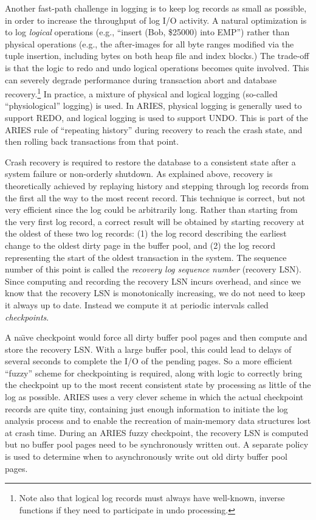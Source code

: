 \documentclass[a4paper,11pt,twoside,openright]{book}
\begin{document}
Another fast-path challenge in logging is to keep log records as small
as possible, in order to increase the throughput of log I/O activity. A
natural optimization is to log \emph{logical} operations (e.g., ``insert
(Bob, \$25000) into EMP'') rather than physical operations (e.g., the
after-images for all byte ranges modified via the tuple insertion,
including bytes on both heap file and index blocks.) The trade-off is
that the logic to redo and undo logical operations becomes quite
involved. This can severely degrade performance during transaction abort
and database recovery.\footnote{Note also that logical log records must always have well-known,
inverse functions if they need to participate in undo processing.} In practice, a mixture of
physical and logical logging (so-called ``physiological'' logging) is
used. In ARIES, physical logging is generally used to support REDO, and
logical logging is used to support UNDO. This is part of the ARIES rule
of ``repeating history'' during recovery to reach the crash state, and
then rolling back transactions from that point.

Crash recovery is required to restore the database to a consistent state
after a system failure or non-orderly shutdown. As explained above,
recovery is theoretically achieved by replaying history and stepping
through log records from the first all the way to the most recent
record. This technique is correct, but not very efficient since the log
could be arbitrarily long. Rather than starting from the very first log
record, a correct result will be obtained by starting recovery at the
oldest of these two log records: (1) the log record describing the
earliest change to the oldest dirty page in the buffer pool, and (2) the
log record representing the start of the oldest transaction in the
system. The sequence number of this point is called the \emph{recovery
log sequence} \emph{number} (recovery LSN). Since computing and
recording the recovery LSN incurs overhead, and since we know that the
recovery LSN is
monotonically increasing, we do not need to keep it always up to date.
Instead we compute it at periodic intervals called \emph{checkpoints}.

A na{\"\i}ve checkpoint would force all dirty buffer pool pages and then
compute and store the recovery LSN. With a large buffer pool, this could
lead to delays of several seconds to complete the I/O of the pending
pages. So a more efficient ``fuzzy'' scheme for checkpointing is
required, along with logic to correctly bring the checkpoint up to the
most recent consistent state by processing as little of the log as
possible. ARIES uses a very clever scheme in which the actual checkpoint
records are quite tiny, containing just enough information to initiate
the log analysis process and to enable the recreation of main-memory
data structures lost at crash time. During an ARIES fuzzy checkpoint,
the recovery LSN is computed but no buffer pool pages need to be
synchronously written out. A separate policy is used to determine when
to asynchronously write out old dirty buffer pool pages.
\end{document}
